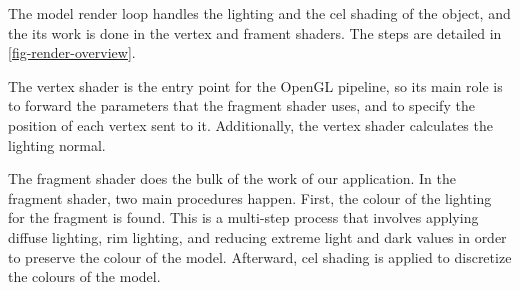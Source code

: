 The model render loop handles the lighting and the cel shading of the object, and the its work is
done in the vertex and frament shaders. The steps are detailed in \autoref{fig-render-overview}.

The vertex shader is the entry point for the OpenGL pipeline, so its main role is to forward the 
parameters that the fragment shader uses, and to specify the position of each vertex sent to it. 
Additionally, the vertex shader calculates the lighting normal.

The fragment shader does the bulk of the work of our application. In the fragment shader, two main
procedures happen. First, the colour of the lighting for the fragment is found. This is a multi-step
process that involves applying diffuse lighting, rim lighting, and reducing extreme light and dark 
values in order to preserve the colour of the model. Afterward, cel shading is applied to discretize
the colours of the model. 

